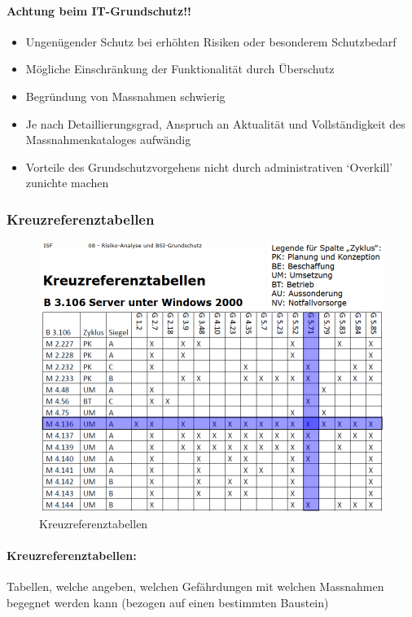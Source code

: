 \documentclass[10pt,a4paper]{article}
\begin{document}
\paragraph*{Achtung beim IT-Grundschutz!!}
\begin{itemize}[noitemsep,topsep=0pt,leftmargin=*]
    \item Ungenügender Schutz bei erhöhten Risiken oder besonderem Schutzbedarf
    \item Mögliche Einschränkung der Funktionalität durch Überschutz
    \item Begründung von Massnahmen schwierig
    \item Je nach Detaillierungsgrad, Anspruch an Aktualität und Vollständigkeit des Massnahmenkataloges aufwändig
    \item Vorteile des Grundschutzvorgehens nicht durch administrativen `Overkill' zunichte machen
\end{itemize}

\subsubsection*{Kreuzreferenztabellen}
\begin{figure}[H]
    \begin{center}
    \includegraphics[width=12cm]{images/Kreuzreferenztabellen.png}
    \caption{Kreuzreferenztabellen}
    \label{Kreuzreferenztabellen}
    \end{center}
\end{figure}

\paragraph*{Kreuzreferenztabellen:}Tabellen, welche angeben, welchen Gefährdungen mit welchen Massnahmen begegnet werden kann (bezogen auf einen bestimmten Baustein)
\end{document}
